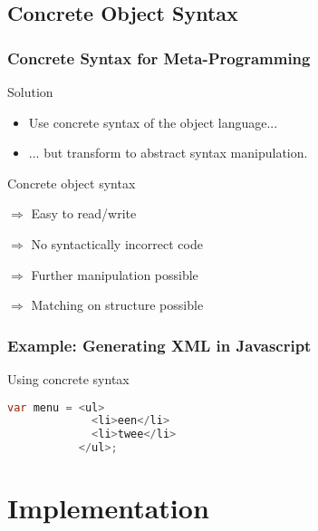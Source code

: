 \documentclass{beamer}
\begin{document}
\subsection{Concrete Object Syntax}

\begin{frame}

  \frametitle{Concrete Syntax for Meta-Programming}

  \begin{block}{Solution}
    \begin{itemize}
      \item Use concrete syntax of the object language...
      \item ... but transform to abstract syntax manipulation.
    \end{itemize}
  \end{block}

  \begin{block}{Concrete object syntax}
    \begin{description}
      \item{\color{darkgreen}$\Rightarrow$} Easy to read/write
      \item{\color{darkgreen}$\Rightarrow$} No syntactically incorrect code
      \item{\color{darkgreen}$\Rightarrow$} Further manipulation possible
      \item{\color{darkgreen}$\Rightarrow$} Matching on structure possible
    \end{description}
  \end{block}

\end{frame}


\begin{frame}[fragile]

  \frametitle{Example: Generating XML in Javascript}

  \begin{block}{Using concrete syntax}
    \begin{lstlisting}[language=Java]
var menu = <ul>
             <li>een</li>
             <li>twee</li>
           </ul>;
    \end{lstlisting}
  \end{block}

\end{frame}


\section{Implementation}
\end{document}
